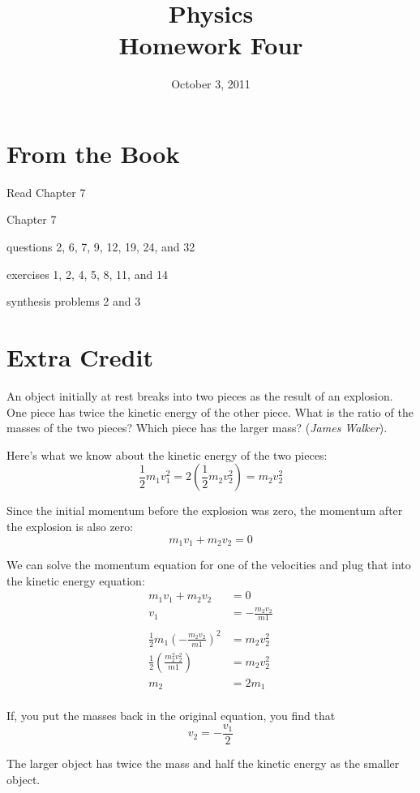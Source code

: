 \documentclass{exam}
\title{Physics \\ Homework Four}
\date{October 3, 2011}
\begin{document}
\maketitle

\section{From the Book}

\begin{itemize*}
  \item Read Chapter 7
  \item Chapter 7
    \begin{itemize*}
      \item questions 2, 6, 7, 9, 12, 19, 24, and 32
      \item exercises 1, 2, 4, 5, 8, 11, and 14
      \item synthesis problems 2 and 3
    \end{itemize*}
\end{itemize*}

\section{Extra Credit}

\begin{questions}

\question 
An object initially at rest breaks into two pieces as the result of an explosion.  One piece has twice the kinetic
energy of the other piece.  What is the ratio of the masses of the two pieces?  Which piece has the larger mass? ({\em James Walker}).

\begin{solution}
Here's what we know about the kinetic energy of the two pieces:
\[
  \frac{1}{2} m_1v_1^2 = 2 \left( \frac{1}{2} m_2v_2^2 \right) = m_2v_2^2
\]

Since the initial momentum before the explosion was zero, the momentum after the explosion is also zero:
\[
  m_1v_1 + m_2v_2 = 0
\]

We can solve the momentum equation for one of the velocities and plug that into the kinetic energy equation:
\begin{align*}
  m_1v_1 + m_2v_2 &= 0 \\
  v_1 &= - \frac{m_2v_2}{m1} \\
  \\
  \frac{1}{2} m_1 \left(- \frac{m_2v_2}{m1} \right)^2 &= m_2 v_2^2 \\
  \frac{1}{2} \left(\frac{m_2^2v_2^2}{m1} \right) &= m_2 v_2^2 \\
  m_2 &= 2m_1 \\
\end{align*}

If, you put the masses back in the original equation, you find that 
\[
  v_2 = - \frac{v_1}{2}
\]

The larger object has twice the mass and half the kinetic energy as the smaller object.

\end{solution}

\end{questions}
\end{document}
